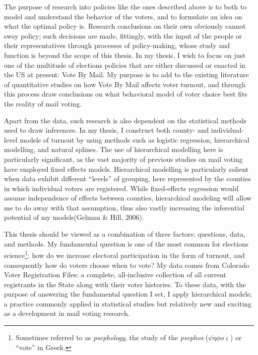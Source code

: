 \documentclass[12pt,twoside]{reedthesis}
\begin{document}
  The purpose of research into policies like the ones described above is
  to both to model and understand the behavior of the voters, and to
  formulate an idea on what the optimal policy is. Research conclusions on
  their own obviously cannot sway policy; such decisions are made,
  fittingly, with the input of the people or their representatives through
  processes of policy-making, whose study and function is beyond the scope
  of this thesis. In my thesis, I wish to focus on just one of the
  multitude of elections policies that are either discussed or enacted in
  the US at present: Vote By Mail. My purpose is to add to the existing
  literature of quantitative studies on how Vote By Mail affects voter
  turnout, and through this process draw conclusions on what behavioral
  model of voter choice best fits the reality of mail voting.
  
  Apart from the data, such research is also dependent on the statistical
  methods used to draw inferences. In my thesis, I construct both county-
  and individual-level models of turnout by using methods such as logistic
  regression, hierarchical modelling, and natural splines. The use of
  hierarchical modelling here is particularly significant, as the vast
  majority of previous studies on mail voting have employed fixed effects
  models. Hierarchical modelling is particularly salient when data exhibit
  different ``levels'' of grouping, here represented by the counties in
  which individual voters are registered. While fixed-effects regression
  would assume independence of effects between counties, hierarchical
  modeling will allow me to do away with that assumption, thus also vastly
  increasing the inferential potential of my models(Gelman \& Hill, 2006).
  
  This thesis should be viewed as a combination of three factors:
  questions, data, and methods. My fundamental question is one of the most
  common for elections science\footnote{Sometimes referred to as
    \emph{psephology}, the study of the \emph{psephos}
    (\(\psi \acute \eta \phi o \varsigma\)) or ``vote'' in Greek.}: how do
  we increase electoral participation in the form of turnout, and
  consequently how do voters choose when to vote? My data comes from
  Colorado Voter Registration Files: a complete, all-inclusive collection
  of all current registrants in the State along with their voter
  histories. To these data, with the purpose of answering the fundamental
  question I set, I apply hierarchical models; a practice commonly applied
  in statistical studies but relatively new and exciting as a development
  in mail voting research.
  
\end{document}

